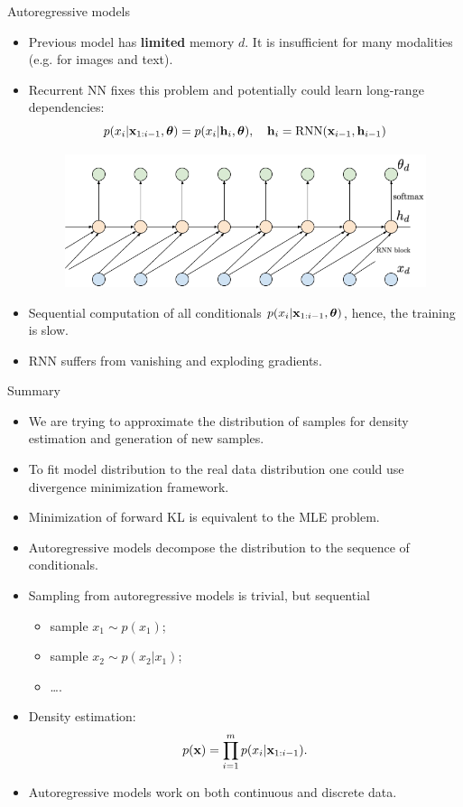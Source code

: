 \begin{frame}{Autoregressive models}
	\begin{itemize}
		\item Previous model has \textbf{limited} memory $d$. It is insufficient for many modalities (e.g. for images and text). 
		\item Recurrent NN fixes this problem and potentially could learn long-range dependencies:
		\[
			p(x_i | \mathbf{x}_{1:i - 1}, \boldsymbol{\theta}) = p(x_i | \mathbf{h}_i, \boldsymbol{\theta}), \quad \mathbf{h}_i = \text{RNN}(\mathbf{x}_{i - 1}, \mathbf{h}_{i - 1})
		\]
		 \begin{figure}
	    \centering
	    \includegraphics[width=0.7\linewidth]{figs/sequential_RNN}
		 \end{figure}
		\item Sequential computation of all conditionals $p(x_i | \mathbf{x}_{1:i-1}, \boldsymbol{\theta})$, hence, the training is slow.
		\item RNN suffers from vanishing and exploding gradients.
	\end{itemize}
\end{frame}
\begin{frame}{Summary}
    \begin{itemize}
    	\item We are trying to approximate the distribution of samples for density estimation and generation of new samples.
    	\item To fit model distribution to the real data distribution one could use divergence minimization framework.
    	\item Minimization of forward KL is equivalent to the MLE problem.
    	\item Autoregressive models decompose the distribution to the sequence of conditionals.
        \item Sampling from autoregressive models is trivial, but sequential
        \begin{itemize}
            \item sample $x_1 \sim p(x_1)$;
            \item sample $x_2 \sim p(x_2 | x_1)$;
            \item \dots.
        \end{itemize}
        \item Density estimation:
        \vspace{-0.2cm}
        \[
            p(\mathbf{x}) = \prod_{i=1}^m p(x_i | \mathbf{x}_{1:i - 1}).
        \]
        \vspace{-0.2cm}
        \item Autoregressive models work on both continuous and discrete data.
    \end{itemize}
\end{frame}

 